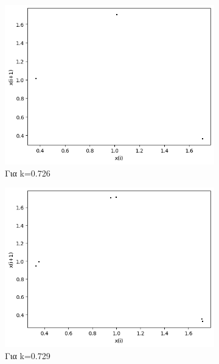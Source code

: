 \begin{figure}[h!]
	\centering
	\begin{subfigure}[b]{0.4\textwidth}
		\centering
		\includegraphics[width=\textwidth]{LateX images/graphs q12/g9}
		\caption{Για k=0.726}
		\label{f:k65}
	\end{subfigure}
	\hfill
	\begin{subfigure}[b]{0.4\textwidth}
		\centering
		\includegraphics[width=\textwidth]{LateX images/graphs q12/g10}
		\caption{Για k=0.729}
		\label{f:k66}
	\end{subfigure}
	\hfill
	\begin{subfigure}[b]{0.4\textwidth}
		\centering

\end{subfigure}
\end{figure}
